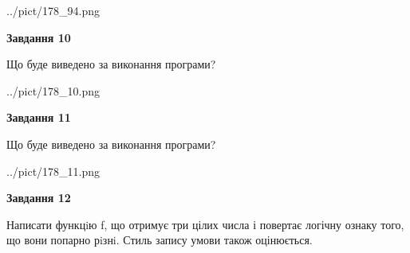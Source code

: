 \documentclass[12pt, ukrainian]{article}
\begin{document}
{\begin {large}
\begin{center}
	{../pict/178_94.png}
\end{center}
\newpage

{\begin {center}\textbf{Завдання 10}\end {center}}

Що буде виведено за виконання програми?\par
\begin{center}
	{../pict/178_10.png}
\end{center}
\newpage

{\begin {center}\textbf{Завдання 11}\end {center}}

Що буде виведено за виконання програми?\par
\begin{center}
	{../pict/178_11.png}
\end{center}
\newpage

{\begin {center}\textbf{Завдання 12}\end {center}}


Написати функцiю f, що отримує три цілих числа і повертає логічну ознаку того, що вони попарно рiзнi. Стиль запису умови також оцінюється.\par
\newpage

\end {large}}
\end{document}
